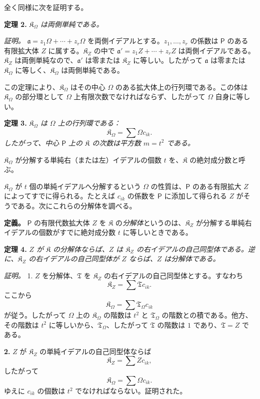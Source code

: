全く同様に次を証明する。

\textbf{定理 2.} \emph{$\mathfrak K_\Omega$ は両側単純である。}

\emph{証明。} $\mathfrak a=z_1\Omega+\cdots+z_r\Omega$ を両側イデアルとする。$z_1,\ldots,z_r$ の係数は $\mathsf P$ のある有限拡大体 $Z$ に属する。$\mathfrak K_Z$ の中で $\mathfrak a'=z_1Z+\cdots+z_rZ$ は両側イデアルである。$\mathfrak K_Z$ は両側単純なので、$\mathfrak a'$ は零または $\mathfrak K_Z$ に等しい。したがって $\mathfrak a$ は零または $\mathfrak K_\Omega$ に等しく、$\mathfrak K_\Omega$ は両側単純である。

この定理により、$\mathfrak K_\Omega$ はその中心 $\Omega$ のある拡大体上の行列環である。この体は $\mathfrak K_\Omega$ の部分環として $\Omega$ 上有限次数でなければならず、したがって $\Omega$ 自身に等しい。

\textbf{定理 3.} \emph{$\mathfrak K_\Omega$ は $\Omega$ 上の行列環である：}
\[
\mathfrak K_\Omega=\sum\Omega c_{ik}.
\]
\emph{したがって、中心 $\mathsf P$ 上の $\mathfrak K$ の次数は平方数 $m=t^2$ である。}

$\mathfrak K_\Omega$ が分解する単純右（または左）イデアルの個数 $t$ を、$\mathfrak K$ の絶対成分数と呼ぶ。

$\mathfrak K_\Omega$ が $t$ 個の単純イデアルへ分解するという $\Omega$ の性質は、$\mathsf P$ のある有限拡大 $Z$ によってすでに得られる。たとえば $c_{ik}$ の係数を $\mathsf P$ に添加して得られる $Z$ がそうである。次にこれらの分解体を調べる。

\textbf{定義。} $\mathsf P$ の有限代数拡大体 $Z$ を $\mathfrak K$ の\emph{分解体}というのは、$\mathfrak K_Z$ が分解する単純右イデアルの個数がすでに絶対成分数 $t$ に等しいときである。

\textbf{定理 4.} \emph{$Z$ が $\mathfrak K$ の分解体ならば、$Z$ は $\mathfrak K_Z$ の右イデアルの自己同型体である。逆に、$\mathfrak K_Z$ の右イデアルの自己同型体が $Z$ ならば、$Z$ は分解体である。}

\emph{証明。} 1. $Z$ を分解体、$\mathfrak T$ を $\mathfrak K_Z$ の右イデアルの自己同型体とする。すなわち
\[
\mathfrak K_Z=\sum\mathfrak T c_{ik}.
\]
ここから
\[
\mathfrak K_\Omega=\sum\mathfrak T_\Omega c_{ik}
\]
が従う。したがって $\Omega$ 上の $\mathfrak K_\Omega$ の階数は $t^2$ と $\mathfrak T_\Omega$ の階数との積である。他方、その階数は $t^2$ に等しいから、$\mathfrak T_\Omega$、したがって $\mathfrak T$ の階数は $1$ であり、$\mathfrak T=Z$ である。

\textbf{2.} $Z$ が $\mathfrak K_Z$ の単純イデアルの自己同型体ならば
\[
\mathfrak K_Z=\sum Zc_{ik},
\]
したがって
\[
\mathfrak K_\Omega=\sum\Omega c_{ik}.
\]
ゆえに $c_{ik}$ の個数は $t^2$ でなければならない。証明された。

